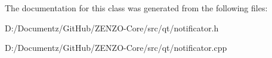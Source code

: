 The documentation for this class was generated from the following files\+:\begin{DoxyCompactItemize}
\item 
D\+:/\+Documentz/\+Git\+Hub/\+Z\+E\+N\+Z\+O-\/\+Core/src/qt/notificator.\+h\item 
D\+:/\+Documentz/\+Git\+Hub/\+Z\+E\+N\+Z\+O-\/\+Core/src/qt/notificator.\+cpp\end{DoxyCompactItemize}
